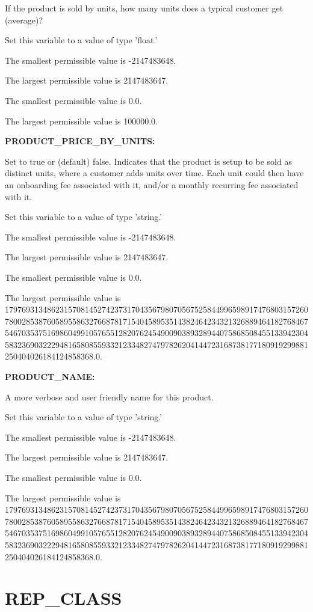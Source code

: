 If the product is sold by units, how many units does a typical customer get (average)?

Set this variable to a value of type 'float.'

The smallest permissible value is -2147483648.

The largest permissible value is 2147483647.

The smallest permissible value is 0.0.

The largest permissible value is 100000.0.


\textbf{PRODUCT\_PRICE\_BY\_UNITS:}


Set to true or (default) false.  Indicates that the product is setup to be sold as distinct units, where a customer adds units over time.  Each unit could then have an onboarding fee associated with it, and/or a monthly recurring fee associated with it.

Set this variable to a value of type 'string.'

The smallest permissible value is -2147483648.

The largest permissible value is 2147483647.

The smallest permissible value is 0.0.

The largest permissible value is 179769313486231570814527423731704356798070567525844996598917476803157260780028538760589558632766878171540458953514382464234321326889464182768467546703537516986049910576551282076245490090389328944075868508455133942304583236903222948165808559332123348274797826204144723168738177180919299881250404026184124858368.0.


\textbf{PRODUCT\_NAME:}


A more verbose and user friendly name for this product.

Set this variable to a value of type 'string.'

The smallest permissible value is -2147483648.

The largest permissible value is 2147483647.

The smallest permissible value is 0.0.

The largest permissible value is 179769313486231570814527423731704356798070567525844996598917476803157260780028538760589558632766878171540458953514382464234321326889464182768467546703537516986049910576551282076245490090389328944075868508455133942304583236903222948165808559332123348274797826204144723168738177180919299881250404026184124858368.0.


\section{REP\_CLASS}


